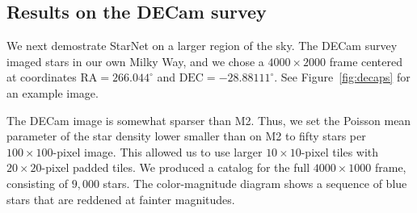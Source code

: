 \subsection{Results on the DECam survey}
\label{sec:results_on_decam}

We next demostrate StarNet on a larger region of the sky.
The DECam survey imaged stars in our own Milky Way, and we chose
a $4000 \times 2000$ frame centered at coordinates $\text{RA} = 266.044^\circ$ and
$\text{DEC} = -28.88111^\circ$. See Figure~\ref{fig:decaps} for an example image.

The DECam image is somewhat sparser than M2.
Thus, we set the Poisson mean parameter of the star density lower smaller than on M2 to fifty stars per $100 \times 100$-pixel image.
This allowed us to use larger $10\times 10$-pixel tiles with $20\times20$-pixel
padded tiles. 
We produced
a catalog for the full $4000 \times 1000$ frame, consisting of $9,000$ stars. 
The color-magnitude diagram shows a sequence of blue
stars that are reddened at fainter magnitudes. 


